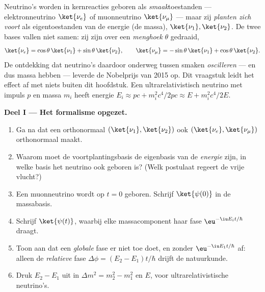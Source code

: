 \begin{problem}\label{pb:b3:quantum-formalism:1}
Neutrino's worden in kernreacties geboren als \emph{smaak}toestanden ---
elektronneutrino $\ket{\nu_e}$ of muonneutrino $\ket{\nu_\mu}$ --- maar
zij \emph{planten zich voort} als eigentoestanden van de energie (de
massa), $\ket{\nu_1},
\ket{\nu_2}$. De twee bases vallen niet samen:
zij zijn over een \emph{menghoek} $\theta$ gedraaid,
\[
\ket{\nu_e} = \cos\theta\,\ket{\nu_1} + \sin\theta\,\ket{\nu_2} ,
\qquad
\ket{\nu_\mu} = -\sin\theta\,\ket{\nu_1} + \cos\theta\,\ket{\nu_2} .
\]
De ontdekking dat neutrino's daardoor onderweg tussen smaken
\emph{oscilleren} --- en dus massa hebben --- leverde de Nobelprijs van
2015 op. Dit vraagstuk leidt het effect af met niets buiten dit hoofdstuk.
Een ultrarelativistisch neutrino met impuls $p$ en massa $m_i$ heeft
energie $E_i \approx pc + m_i^2c^4/2pc \approx E +
m_i^2c^4/2E$.

\medskip\noindent\textbf{Deel I --- Het formalisme opgezet.}
\begin{enumerate}
  \item Ga na dat een orthonormaal $(\ket{\nu_1}, \ket{\nu_2})$ ook
        $(\ket{\nu_e}, \ket{\nu_\mu})$ orthonormaal maakt.
  \item Waarom moet de voortplantingsbasis de eigenbasis van de
        \emph{energie} zijn, in welke basis het neutrino ook geboren is?
        (Welk postulaat regeert de vrije vlucht?)
  \item Een muonneutrino wordt op $t = 0$ geboren. Schrijf
        $\ket{\psi(0)}$ in de massabasis.
  \item Schrijf $\ket{\psi(t)}$, waarbij elke massacomponent haar fase
        $\eu^{-\iu E_it/\hbar}$ draagt.
  \item Toon aan dat een \emph{globale} fase er niet toe doet, en zonder
        $\eu^{-\iu E_1t/\hbar}$ af: alleen de \emph{relatieve} fase
        $\Delta\phi = (E_2 - E_1)t/\hbar$ drijft de natuurkunde.
  \item Druk $E_2 - E_1$ uit in $\Delta m^2 = m_2^2 - m_1^2$ en $E$,
        voor ultrarelativistische neutrino's.
\end{enumerate}


\end{problem}
